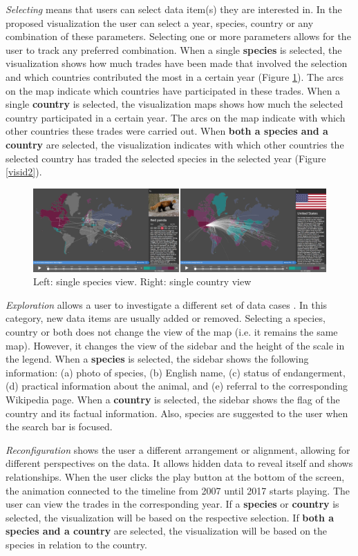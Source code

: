 \textit{Selecting} means that users can select data item(s) they are interested in. In the proposed visualization the user can select a year, species, country or any combination of these parameters. Selecting one or more parameters allows for the user to track any preferred combination. When a single \textbf{species} is selected, the visualization shows how much trades have been made that involved the selection and which countries contributed the most in a certain year (Figure \ref{visid1}). The arcs on the map indicate which countries have participated in these trades. When a single \textbf{country} is selected, the visualization maps shows how much the selected country participated in a certain year. The arcs on the map indicate with which other countries these trades were carried out. When \textbf{both a species and a country} are selected, the visualization indicates with which other countries the selected country has traded the selected species in the selected year (Figure \ref{visid2}). 

\begin{figure} [h] 
\includegraphics[width=12cm]{images/twosingle.png}
\caption{Left: single species view. Right: single country view}
\label{visid1}
\end{figure}

\textit{Exploration} allows a user to investigate a different set of data cases \cite{Yi2007}. In this category, new data items are usually added or removed. Selecting a species, country or both does not change the view of the map (i.e. it remains the same map). However, it changes the view of the sidebar and the height of the scale in the legend. When a \textbf{species} is selected, the sidebar shows the following information: (a) photo of species, (b) English name, (c) status of endangerment, (d) practical information about the animal, and (e) referral to the corresponding Wikipedia page. When a \textbf{country} is selected, the sidebar shows the flag of the country and its factual information. Also, species are suggested to the user when the search bar is focused.

\textit{Reconfiguration} shows the user a different arrangement or alignment, allowing for different perspectives on the data. It allows hidden data to reveal itself and shows relationships. When the user clicks the play button at the bottom of the screen, the animation connected to the timeline from 2007 until 2017 starts playing. The user can view the trades in the corresponding year. If a \textbf{species} or \textbf{country} is selected, the visualization will be based on the respective selection. If \textbf{both a species and a country} are selected, the visualization will be based on the species in relation to the country.  

